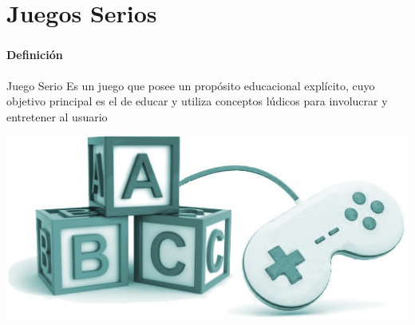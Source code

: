 
\section{Juegos Serios}
\setcounter{sectiontotal}{5}

\begin{frame}
    \frametitle{\pagetitle}
    \framesubtitle{Definición}
    \begin{block}{Juego Serio}
    \centering
    Es un juego que posee un propósito educacional explícito, cuyo objetivo
    principal es el de educar y utiliza conceptos lúdicos para involucrar y
    entretener al usuario
    \end{block}   
    \begin{center}
    \includegraphics[scale=.5]{imagenes/juegos_educacion}
    \end{center}
\end{frame}

